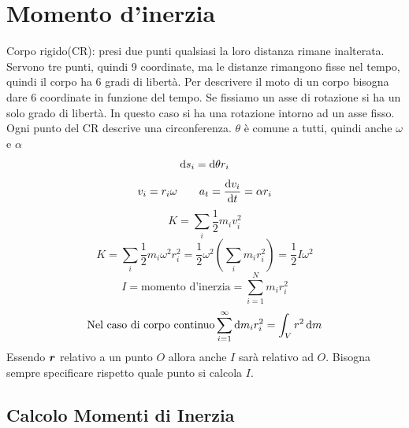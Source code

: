 \section{Momento d'inerzia}
Corpo rigido(CR): presi due punti qualsiasi la loro distanza
rimane inalterata. Servono tre punti, quindi 9 coordinate, ma le
distanze rimangono fisse nel tempo, quindi il corpo ha 6 gradi di
libertà. Per descrivere il moto di un corpo bisogna dare 6
coordinate in funzione del tempo. Se fissiamo un asse di rotazione
si ha un solo grado di libertà. In questo caso si ha una rotazione
intorno ad un asse fisso. Ogni punto del CR descrive una
circonferenza. $\theta$ è comune a tutti, quindi anche $\omega$ e
$\alpha$
\begin{equation*}\mathrm{d} s_i=\mathrm{d} \theta r_i\end{equation*}
\begin{equation*}v_i=r_i\omega \qquad a_t=\frac{\mathrm{d} v_i}{\mathrm{d} t}=\alpha r_i\end{equation*}
\begin{equation*}K=\sum_i\frac{1}{2}m_iv_i^2\end{equation*}
\begin{equation*}K=\sum_i\frac{1}{2}m_i\omega^2r_i^2=\frac{1}{2}\omega^2\left(\sum_im_ir_i^2\right)=\frac{1}{2}I\omega^2\end{equation*}
\begin{equation*}I=\text{momento d'inerzia}=\sum_{i=1}^N m_ir_i^2\end{equation*}
\begin{equation*}\text{Nel caso di corpo continuo} \sum_{i=1}^\infty \mathrm{d} m_ir_i^2=\int_V  r^2\,\mathrm{d} m\end{equation*}
Essendo $\boldsymbol{r}$ relativo a un punto $O$ allora anche $I$ sarà relativo ad $O$. Bisogna sempre specificare rispetto quale punto si calcola $I$.

\subsection{Calcolo Momenti di Inerzia}

